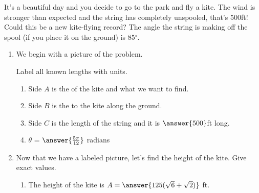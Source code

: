 \documentclass{ximera}
\author{Elizabeth Campolongo}
\begin{document}
\begin{exercise}

It's a beautiful day and you decide to go to the park and fly a kite. The wind is stronger than expected and the string has completely unspooled, that's 500ft! Could this be a new kite-flying record? The angle the string is making off the spool (if you place it on the ground) is 85$^\circ$.


\begin{enumerate}

\item We begin with a picture of the problem. 

		\begin{image}[2in]
		\end{image}

Label all known lengths with units.
\begin{enumerate}
\item Side $A$ is the  of the kite and what we want to find.

\item Side $B$ is the  to the kite along the ground.

\item Side $C$ is the length of the string and it is $\answer{500}$ft long.

\item $\theta$ = $\answer{\frac{5\pi}{12}}$ radians

\end{enumerate}

\item \begin{exercise}
Now that we have a labeled picture, let's find the height of the kite. Give exact values.
\begin{enumerate}
\item The height of the kite is $A = \answer{125(\sqrt{6}+\sqrt{2})}$ ft.


\end{enumerate}
\end{exercise}
\end{enumerate}
\end{exercise}
\end{document}
